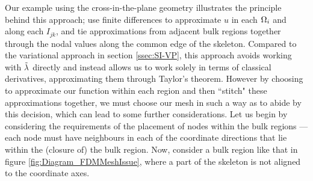 
Our example using the cross-in-the-plane geometry illustrates the principle behind this approach; use finite differences to approximate $u$ in each $\Omega_i$ and along each $I_{jk}$, and tie approximations from adjacent bulk regions together through the nodal values along the common edge of the skeleton.
Compared to the variational approach in section \ref{ssec:SI-VP}, this approach avoids working with $\tilde{\lambda}$ directly and instead allows us to work solely in terms of classical derivatives, approximating them through Taylor's theorem.
However by choosing to approximate our function within each region and then ``stitch" these approximations together, we must choose our mesh in such a way as to abide by this decision, which can lead to some further considerations.
Let us begin by considering the requirements of the placement of nodes within the bulk regions --- each node must have neighbours in each of the coordinate directions that lie within the (closure of) the bulk region.
Now, consider a bulk region like that in figure \ref{fig:Diagram_FDMMeshIssue}, where a part of the skeleton is not aligned to the coordinate axes.
